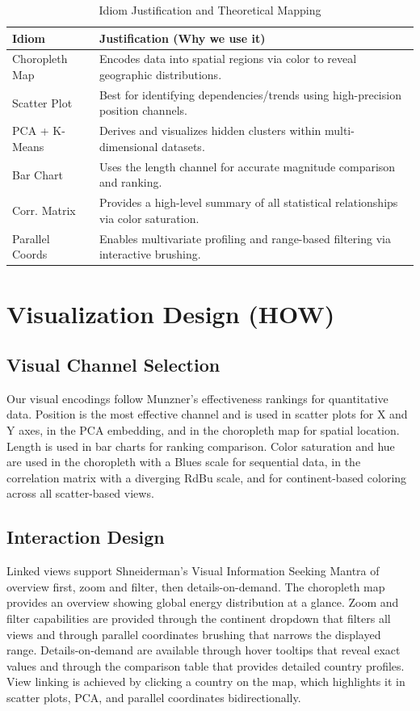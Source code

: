 \documentclass[conference]{IEEEtran}
\begin{document}
\begin{table}[H]
\centering
\caption{Idiom Justification and Theoretical Mapping}
\label{tab:idiom_justification}
\small
\begin{tabular}{|p{2.2cm}|p{5.5cm}|}
\hline
\textbf{Idiom} & \textbf{Justification (Why we use it)} \\
\hline
Choropleth Map & Encodes data into spatial regions via color to reveal geographic distributions. \\
\hline
Scatter Plot & Best for identifying dependencies/trends using high-precision position channels. \\
\hline
PCA + K-Means & Derives and visualizes hidden clusters within multi-dimensional datasets. \\
\hline
Bar Chart & Uses the length channel for accurate magnitude comparison and ranking. \\
\hline
Corr. Matrix & Provides a high-level summary of all statistical relationships via color saturation. \\
\hline
Parallel Coords & Enables multivariate profiling and range-based filtering via interactive brushing. \\
\hline
\end{tabular}
\end{table}

\section{Visualization Design (HOW)}
\subsection{Visual Channel Selection}
Our visual encodings follow Munzner's effectiveness rankings for quantitative data. Position is the most effective channel and is used in scatter plots for X and Y axes, in the PCA embedding, and in the choropleth map for spatial location. Length is used in bar charts for ranking comparison. Color saturation and hue are used in the choropleth with a Blues scale for sequential data, in the correlation matrix with a diverging RdBu scale, and for continent-based coloring across all scatter-based views.

\subsection{Interaction Design}
Linked views support Shneiderman's Visual Information Seeking Mantra of overview first, zoom and filter, then details-on-demand. The choropleth map provides an overview showing global energy distribution at a glance. Zoom and filter capabilities are provided through the continent dropdown that filters all views and through parallel coordinates brushing that narrows the displayed range. Details-on-demand are available through hover tooltips that reveal exact values and through the comparison table that provides detailed country profiles. View linking is achieved by clicking a country on the map, which highlights it in scatter plots, PCA, and parallel coordinates bidirectionally.
\end{document}
